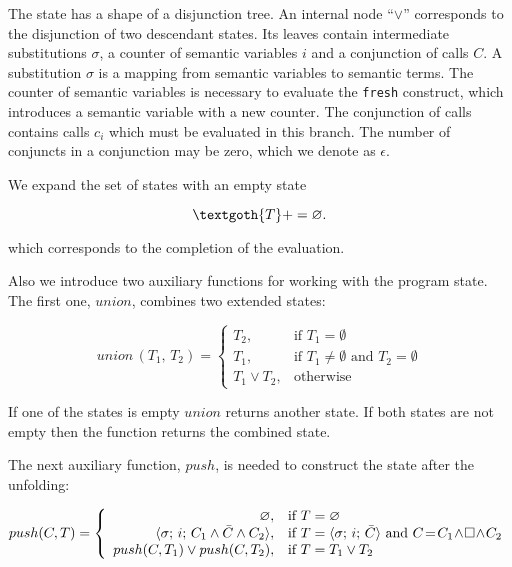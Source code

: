 The state has a shape of a disjunction tree. An internal node ``$\lor$'' corresponds to the disjunction of two descendant states.
Its leaves contain intermediate substitutions $\sigma$, a counter of semantic variables $i$ and a conjunction of calls $C$. A substitution $\sigma$ is a
mapping from semantic variables to semantic terms. The counter of semantic variables is necessary to evaluate the \lstinline{fresh} construct,
which introduces a semantic variable with a new counter. The conjunction of calls contains calls $c_i$ which must be evaluated in this branch.
The number of conjuncts in a conjunction may be zero, which we denote as $\epsilon$.


We expand the set of states with an empty state

\[
\textgoth{T} += \emptyset.
\]

which corresponds to the completion of the evaluation.

Also we introduce two auxiliary functions for working with the program state. The first one,  $union$, combines two extended states:

\[
union\,(T_1,\, T_2) =
\left\{
\begin{array}{rl}
T_2, & \mbox{if } T_1 = \emptyset \\
T_1, & \mbox{if } T_1 \not= \emptyset \mbox{ and } T_2 = \emptyset \\
T_1 \lor T_2, & \mbox{otherwise}
\end{array}
\right.
\]


If one of the states is empty $union$ returns another state. If both states are not empty then the function returns the combined state.

The next auxiliary function, $push$, is needed to construct the state after the unfolding:

\[
push(C, T) =
\left\{
\begin{array}{rl}
\varnothing, &  \mbox{if } T = \varnothing \\
\langle \sigma;\, i;\, C_1 \land \bar{C} \land C_2 \rangle, & \mbox{if } T = \langle \sigma;\, i;\, \bar{C} \rangle \mbox{ and } C \!=\! C_1\! \land\! \Box\! \land\! C_2 \\
push(C, T_1) \lor push(C, T_2), & \mbox{if } T = T_1 \lor T_2
\end{array}
\right.
\]

